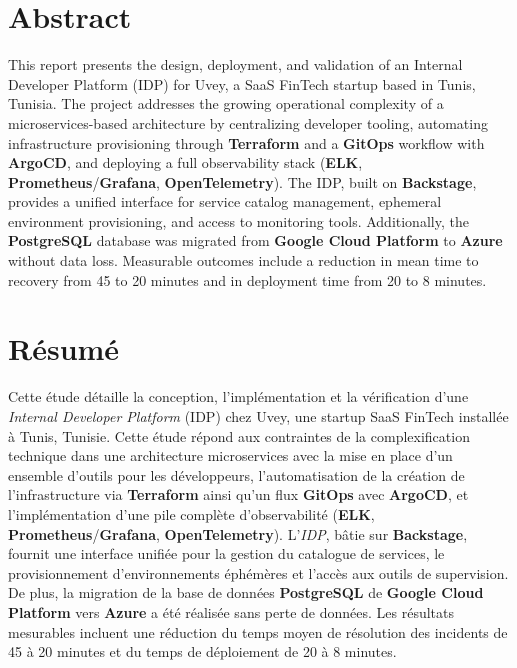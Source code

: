\chapter*{Abstract}
\par This report presents the design, deployment, and validation of an Internal Developer
Platform (IDP) for Uvey, a SaaS FinTech startup based in Tunis, Tunisia. The project
addresses the growing operational complexity of a microservices-based architecture by
centralizing developer tooling, automating infrastructure provisioning through
\textbf{Terraform} and a \textbf{GitOps} workflow with \textbf{ArgoCD}, and deploying a
full observability stack (\textbf{ELK}, \textbf{Prometheus}/\textbf{Grafana},
\textbf{OpenTelemetry}). The IDP, built on \textbf{Backstage}, provides a unified
interface for service catalog management, ephemeral environment provisioning, and access
to monitoring tools. Additionally, the \textbf{PostgreSQL} database was migrated from
\textbf{Google Cloud Platform} to \textbf{Azure} without data loss. Measurable outcomes
include a reduction in mean time to recovery from 45 to 20 minutes and in deployment
time from 20 to 8 minutes.
\vspace{0.5cm}


\newpage

\chapter*{Résumé}
\par Cette étude détaille la conception, l'implémentation et la vérification d'une
\textit{Internal Developer Platform} (IDP) chez Uvey, une startup SaaS FinTech
installée à Tunis, Tunisie. Cette étude répond aux contraintes de la complexification
technique dans une architecture microservices avec la mise en place d'un ensemble
d'outils pour les développeurs, l'automatisation de la création de l'infrastructure
via \textbf{Terraform} ainsi qu'un flux \textbf{GitOps} avec \textbf{ArgoCD}, et
l'implémentation d'une pile complète d'observabilité (\textbf{ELK},
\textbf{Prometheus}/\textbf{Grafana}, \textbf{OpenTelemetry}). L'\textit{IDP},
bâtie sur \textbf{Backstage}, fournit une interface unifiée pour la gestion du catalogue
de services, le provisionnement d'environnements éphémères et l'accès aux outils de
supervision. De plus, la migration de la base de données \textbf{PostgreSQL} de
\textbf{Google Cloud Platform} vers \textbf{Azure} a été réalisée sans perte de données.
Les résultats mesurables incluent une réduction du temps moyen de résolution des
incidents de 45 à 20 minutes et du temps de déploiement de 20 à 8 minutes.
\vspace{0.5cm}

